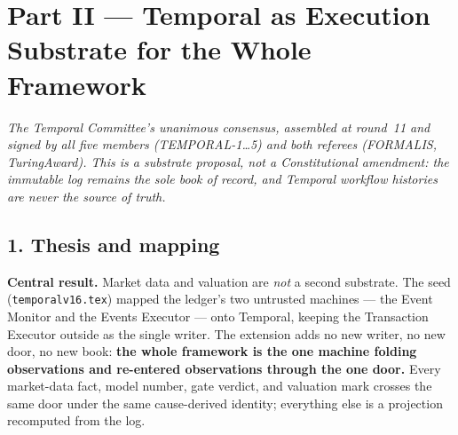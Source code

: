 \documentclass[11pt,a4paper]{article}
\begin{document}
\clearpage

\begingroup
\small
\linespread{0.94}\selectfont
\setlength{\parskip}{0.5pt plus 1pt minus 0.5pt}
\setlength{\LTpre}{2pt}\setlength{\LTpost}{2pt}
\section*{Part II --- Temporal as Execution Substrate for the Whole Framework}

\noindent\emph{The Temporal Committee's unanimous consensus, assembled at round~11 and signed
by all five members (TEMPORAL-1\ldots5) and both referees (FORMALIS, TuringAward). This is a
substrate proposal, not a Constitutional amendment: the immutable log remains the sole book of
record, and Temporal workflow histories are never the source of truth.}

\subsection*{1. Thesis and mapping}

\textbf{Central result.} Market data and valuation are \emph{not} a second substrate. The seed
(\texttt{temporalv16.tex}) mapped the ledger's two untrusted machines --- the Event Monitor and the
Events Executor --- onto Temporal, keeping the Transaction Executor outside as the single writer. The
extension adds no new writer, no new door, no new book: \textbf{the whole framework is the one machine
folding observations and re-entered observations through the one door.} Every market-data fact, model
number, gate verdict, and valuation mark crosses the same door under the same cause-derived identity;
everything else is a projection recomputed from the log.
\end{document}

